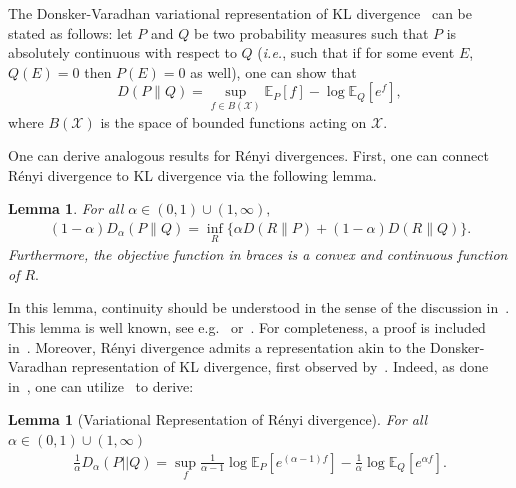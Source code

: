\documentclass{article}
\numberwithin{theorem}{section}
\newtheorem{lemma}[theorem]{Lemma}
\numberwithin{example}{section}
\numberwithin{remark}{section}
\numberwithin{definition}{section}
\newcommand{\E}{\mathbb{E}}
\newcommand{\X}{\mathcal{X}}
\newcommand{\revised}[1]{{\color{black} #1}}
\begin{document}
\revised{The Donsker-Varadhan variational representation of KL divergence~\cite[Section 10]{Varadhan:84}  can be stated as follows: %
let $P$ and $Q$ be two probability measures such that $P$ is absolutely continuous with respect to $Q$ (\textit{i.e.}, such that if for some event $E$, $Q(E)=0$ then $P(E)=0$ as well), one can show that~\cite[Theorem 5.6]{RassoulS:15}}
 \begin{equation}
     D(P\|Q) = \sup_{f\in B(\X)} \E_{P} \left[f \right] - \log \E_{Q} \left[ e^f \right],
 \end{equation}
 where $B(\X)$ is the space of bounded functions acting on $\X$.



One can derive analogous results for R\'enyi divergences.  First, one can connect R\'enyi divergence to KL divergence via the following lemma. 


\begin{lemma}\label{prop:RenyiViaKL}
    For all $\alpha \in (0,1)\cup (1,\infty),$
\begin{align}
   (1-\alpha)D_\alpha (P\|Q) = \inf_R \{\alpha D(R\|P) + (1-\alpha) D(R\|Q) \}.
\end{align}
Furthermore, the objective function in braces is a convex and continuous function of $R.$
\end{lemma}

In this lemma, continuity should be understood in the sense of the discussion in~\cite[Section III.D]{renyiDiv}.
This lemma is well known, see e.g.~\cite[Theorem 30]{renyiDiv} or~\cite{shayevitz:2011}. For completeness, a proof is included in~. Moreover, R\'enyi divergence admits a representation akin to the Donsker-Varadhan representation of KL divergence, first observed by~\cite{atar:15}. Indeed, as done in~\cite{anantharam:18}, one can utilize~ to derive:

\begin{lemma}[Variational Representation of R\'enyi divergence]\label{lemma-variationalRenyiDiv}
    For all $\alpha \in (0,1)\cup (1,\infty) $
\begin{equation}
    \begin{split}
        \frac{1}{\alpha} D_\alpha (P||Q)= \sup_f \frac{1}{\alpha-1} \log \E_P \left[ e^{(\alpha-1)f} \right]- \frac{1}{\alpha} \log \E_Q \left[e^{\alpha f} \right].
    \end{split}
\end{equation}
    
\end{lemma}
\end{document}
